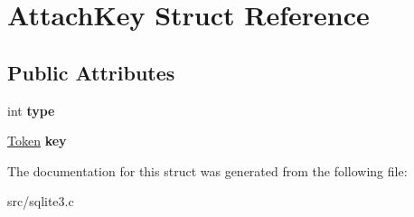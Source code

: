 \hypertarget{struct_attach_key}{\section{Attach\-Key Struct Reference}
\label{struct_attach_key}
}
\subsection*{Public Attributes}
\begin{DoxyCompactItemize}
\item 
\hypertarget{struct_attach_key_acd780bfae7415a79a90fa5ceb41515cd}{int {\bfseries type}}\label{struct_attach_key_acd780bfae7415a79a90fa5ceb41515cd}

\item 
\hypertarget{struct_attach_key_a267449f11a142a3b88c54aa01f842ad0}{\hyperlink{struct_token}{Token} {\bfseries key}}\label{struct_attach_key_a267449f11a142a3b88c54aa01f842ad0}

\end{DoxyCompactItemize}


The documentation for this struct was generated from the following file\-:\begin{DoxyCompactItemize}
\item 
src/sqlite3.\-c\end{DoxyCompactItemize}
